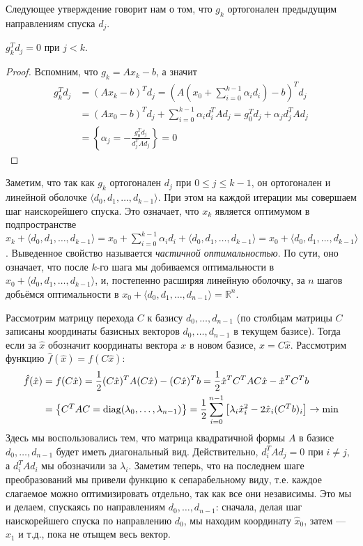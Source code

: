\documentclass[a4paper, 12pt]{article}
\begin{document}
Следующее утверждение говорит нам о том, что $g_k$ ортогонален предыдущим направлениям спуска $d_j$.
\begin{Statement}
$g_k^Td_j = 0$ при $j < k$.
\end{Statement}
\begin{proof} Вспомним, что $g_k = Ax_k - b$, а значит
\begin{align}
    g_k^T d_j &= (Ax_k - b)^T d_j = \left(A\left(x_0 + \sum_{i=0}^{k-1} \alpha_i d_i\right) - b\right)^T d_j \\ &= (Ax_0 - b)^T d_j + \sum_{i=0}^{k-1} \alpha_i d_i^T A d_j = g_0^Td_j + \alpha_j d_j^T A d_j \\ &= \left\{ \alpha_j = -\frac{g_0^Td_j}{d_j^TAd_j}\right\} = 0
\end{align}
\end{proof}

Заметим, что так как $g_k$ ортогонален $d_j$ при $0 \leq j \leq k-1$, он ортогонален и линейной оболочке $\langle d_0, d_1, \dots, d_{k - 1} \rangle$. При этом на каждой итерации мы совершаем шаг наискорейшего спуска. Это означает, что $x_k$ является оптимумом в подпространстве $x_k + \langle d_0, d_1, \dots, d_{k - 1} \rangle = x_0 + \sum\limits_{i=0}^{k-1} \alpha_i d_i + \langle d_0, d_1, \dots, d_{k - 1} \rangle = x_0 + \langle d_0, d_1, \dots, d_{k - 1} \rangle$. Выведенное свойство называется \textit{частичной оптимальностью}. По сути, оно означает, что после $k$-го шага мы добиваемся оптимальности в $x_0 + \langle d_0, d_1, \dots, d_{k - 1} \rangle$, и, постепенно расширяя линейную оболочку, за $n$ шагов добьёмся оптимальности в $x_0 + \langle d_0, d_1, \dots, d_{n - 1} \rangle = \mathbb{R}^n$.

Рассмотрим матрицу перехода $C$ к базису $d_0, \dots, d_{n-1}$ (по столбцам матрицы $C$ записаны координаты базисных векторов $d_0, \dots, d_{n-1}$ в текущем базисе). Тогда если за $\hat{x}$ обозначит координаты вектора $x$ в новом базисе, $x = C\hat{x}$. Рассмотрим функцию $\hat{f}(\hat{x}) = f(C\hat{x})$:
\begin{align}
    \hat{f}(\hat{x}) &= f(C\hat{x}) = \frac{1}{2}(C\hat{x})^T A (C\hat{x}) - (C\hat{x})^T b = \frac{1}{2} \hat{x}^TC^TAC\hat{x} - \hat{x}^TC^Tb \\ &= \left\{C^TAC=\mathrm{diag}(\lambda_0, \dots, \lambda_{n-1})\right\} =  \frac{1}{2} \sum_{i=0}^{n-1} \left[ \lambda_i\hat{x}_i^2 - 2\hat{x}_i (C^Tb)_i \right] \to \min
\end{align}
Здесь мы воспользовались тем, что матрица квадратичной формы $A$ в базисе $d_0, \dots, d_{n-1}$ будет иметь диагональный вид. Действительно, $d_i^TAd_j = 0$ при $i \neq j$, а $d_i^TAd_i$ мы обозначили за $\lambda_i$. Заметим теперь, что на последнем шаге преобразований мы привели функцию к сепарабельному виду, т.е. каждое слагаемое можно оптимизировать отдельно, так как все они независимы. Это мы и делаем, спускаясь по направлениям $d_0, \dots, d_{n-1}$: сначала, делая шаг наискорейшего спуска по направлению $d_0$, мы находим координату $\hat{x}_0$, затем --- $\hat{x}_1$ и т.д., пока не отыщем весь вектор.
\end{document}
